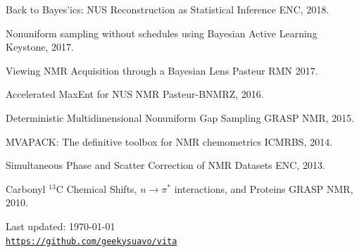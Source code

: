 \documentclass[letterpaper]{article}
\def\footerlink{https://github.com/geekysuavo/vita}
\renewenvironment{itemize}{
  \begin{list}{}{
    \setlength{\leftmargin}{1.5em}
  }
}{
  \end{list}
}
\begin{document}
\begin{itemize}
 \item Back to Bayes'ics: NUS Reconstruction as Statistical Inference
  \hfill ENC, 2018.

 \item Nonuniform sampling without schedules using Bayesian Active Learning
  \hfill Keystone, 2017.

 \item Viewing NMR Acquisition through a Bayesian Lens
  \hfill Pasteur RMN 2017.

 \item Accelerated MaxEnt for NUS NMR
  \hfill Pasteur-BNMRZ, 2016.

 \item Deterministic Multidimensional Nonuniform Gap Sampling
  \hfill GRASP NMR, 2015.

 \item MVAPACK: The definitive toolbox for NMR chemometrics
  \hfill ICMRBS, 2014.

 \item Simultaneous Phase and Scatter Correction of NMR Datasets
  \hfill ENC, 2013.

 \item Carbonyl $^{13}$C Chemical Shifts, $n\rightarrow\pi^*$ interactions,
  and Proteins \hfill GRASP NMR, 2010.
\end{itemize}

\bigskip

\begin{center}
  \begin{footnotesize}
    Last updated: \today \\
    \href{\footerlink}{\texttt{\footerlink}}
  \end{footnotesize}
\end{center}

\end{document}
